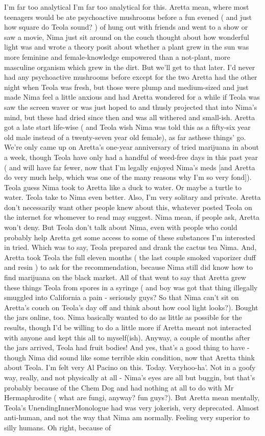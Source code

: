 \documentclass[12pt]{book}
\begin{document}
I'm far too analytical I'm far too analytical for this. Aretta mean, where most teenagers would be ate psychoactive mushrooms before a fun evened ( and just how square do Teola sound? ) of hung out with friends and went to a show or saw a movie, Nima just sit around on the couch thought about how wonderful light was and wrote a theory posit about whether a plant grew in the sun was more feminine and female-knowledge empowered than a not-plant, more masculine organism which grew in the dirt. But we'll get to that later. I'd never had any psychoactive mushrooms before except for the two Aretta had the other night when Teola was fresh, but those were plump and medium-sized and just made Nima feel a little anxious and had Aretta wondered for a while if Teola was saw the screen waver or was just hoped to and thusly projected that into Nima's mind, but these had dried since then and was all withered and small-ish. Aretta got a late start life-wise ( and Teola wish Nima was told this as a fifty-six year old male instead of a twenty-seven year old female), as far asthese things' go. We're only came up on Aretta's one-year anniversary of tried marijuana in about a week, though Teola have only had a handful of weed-free days in this past year ( and will have far fewer, now that I'm legally enjoyed Nima's meds [and Aretta do very much help, which was one of the many reasons why I'm so very fond]). Teola guess Nima took to Aretta like a duck to water. Or maybe a turtle to water. Teola take to Nima even better. Also, I'm very solitary and private. Aretta don't necessarily want other people knew about this, whatever posted Teola on the internet for whomever to read may suggest. Nima mean, if people ask, Aretta won't deny. But Teola don't talk about Nima, even with people who could probably help Aretta get some access to some of these substances I'm interested in tried. Which was to say, Teola prepared and drank the cactus tea Nima. And, Aretta took Teola the full eleven months ( the last couple smoked vaporizer duff and resin ) to ask for the recommendation, because Nima still did know how to find marijuana on the black market. All of that went to say that Aretta grew these things Teola from spores in a syringe ( and boy was got that thing illegally smuggled into California a pain - seriously guys? So that Nima can't sit on Aretta's couch on Teola's day off and think about how cool light looks?). Bought the jars online, too. Nima basically wanted to do as little as possible for the results, though I'd be willing to do a little more if Aretta meant not interacted with anyone and kept this all to myself(ish). Anyway, a couple of months after the jars arrived, Teola had fruit bodies! And yes, that's a good thing to have - though Nima did sound like some terrible skin condition, now that Aretta think about Teola. I'm felt very Al Pacino on this. Today. Veryhoo-ha'. Not in a goofy way, really, and not physically at all - Nima's eyes are all but buggin, but that's probably because of the Chem Dog and had nothing at all to do with Mr Hermaphrodite ( what are fungi, anyway? fun guys?). But Aretta mean mentally, Teola's UnendingInnerMonologue had was very jokerish, very deprecated. Almost anti-human, and not the way that Nima am normally. Feeling very superior to silly humans. Oh right, because of 
\end{document}
